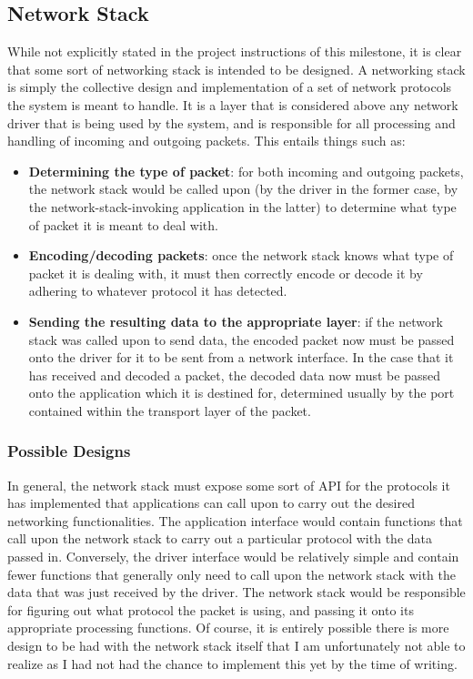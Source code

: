 \subsection{Network Stack}
While not explicitly stated in the project instructions of this milestone, it is clear that some sort of networking stack is intended to be designed. A networking stack is simply the collective design and implementation of a set of network protocols the system is meant to handle. It is a layer that is considered above any network driver that is being used by the system, and is responsible for all processing and handling of incoming and outgoing packets. This entails things such as:
\begin{itemize}
    \item \textbf{Determining the type of packet}: for both incoming and outgoing packets, the network stack would be called upon (by the driver in the former case, by the network-stack-invoking application in the latter) to determine what type of packet it is meant to deal with.
    \item \textbf{Encoding/decoding packets}: once the network stack knows what type of packet it is dealing with, it must then correctly encode or decode it by adhering to whatever protocol it has detected.
    \item \textbf{Sending the resulting data to the appropriate layer}: if the network stack was called upon to send data, the encoded packet now must be passed onto the driver for it to be sent from a network interface. In the case that it has received and decoded a packet, the decoded data now must be passed onto the application which it is destined for, determined usually by the port contained within the transport layer of the packet.
\end{itemize}

\subsubsection{Possible Designs}
In general, the network stack must expose some sort of API for the protocols it has implemented that applications can call upon to carry out the desired networking functionalities. The application interface would contain functions that call upon the network stack to carry out a particular protocol with the data passed in. Conversely, the driver interface would be relatively simple and contain fewer functions that generally only need to call upon the network stack with the data that was just received by the driver. The network stack would be responsible for figuring out what protocol the packet is using, and passing it onto its appropriate processing functions. Of course, it is entirely possible there is more design to be had with the network stack itself that I am unfortunately not able to realize as I had not had the chance to implement this yet by the time of writing.

